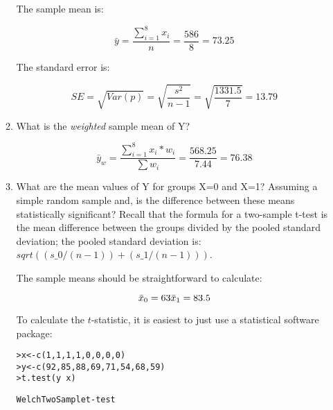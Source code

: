 \documentclass[a4paper]{exam}
\begin{document}
\begin{enumerate}
\begin{enumerate}
	\begin{solution}
	
	The sample mean is:
	
	\begin{equation}
	\bar{y} = \dfrac{\sum_{i=1}^{8} x_i}{n} = \dfrac{586}{8} = 73.25
	\end{equation}
	
	The standard error is:
	
	\begin{equation}
	SE = \sqrt{Var(p)} = \sqrt{\frac{s^2}{n-1}} = \sqrt{\frac{1331.5}{7}} = 13.79
	\end{equation}
	
	\end{solution}
	
	\item What is the \emph{weighted} sample mean of Y?
	
	\begin{solution}
	
	\begin{equation}
	\bar{y}_w = \dfrac{\sum_{i=1}^{8} x_i * w_i}{\sum w_i} = \dfrac{568.25}{7.44} = 76.38
	\end{equation}
		
	
	\end{solution}
	
	\item  What are the mean values of Y for groups X=0 and X=1? Assuming a simple random sample and, is the difference between these means statistically significant? Recall that the formula for a two-sample t-test is the mean difference between the groups divided by the pooled standard deviation; the pooled standard deviation is: $sqrt((s\_0/(n-1)) + (s\_1/(n-1)))$.
	
	\begin{solution}
	
	The sample means should be straightforward to calculate:
	
	\begin{equation}
	\bar{x}_0 = 63\\
	\bar{x}_1 = 83.5
	\end{equation}
	
	To calculate the $t$-statistic, it is easiest to just use a statistical software package:
	
	\begin{alltt}
	> x <- c(1,1,1,1,0,0,0,0)
	> y <- c(92, 85, 88, 69, 71, 54, 68, 59)
	> t.test(y ~ x)
	
	        Welch Two Sample t-test
	

\end{alltt}
\end{solution}
\end{enumerate}
\end{enumerate}
\end{document}

